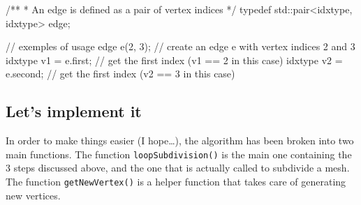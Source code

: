 \documentclass[a4paper,11pt]{article}
\newcommand{\hilight}[1]{\colorbox{bg}{#1}}
\newcommand{\code}[1]{\hilight{\texttt{#1}}}
\begin{document}
{\smaller
\begin{cppcode}
/**
 * An edge is defined as a pair of vertex indices 
 */
typedef std::pair<idxtype, idxtype> edge;

// exemples of usage
edge e(2, 3);           // create an edge e with vertex indices 2 and 3
idxtype v1 = e.first;   // get the first index (v1 == 2 in this case)
idxtype v2 = e.second;  // get the first index (v2 == 3 in this case)
\end{cppcode}
}


\subsection{Let's implement it}

In order to make things easier (I hope\ldots), the algorithm has been broken into two main functions. The function \code{loopSubdivision()} is the main one containing the 3 steps discussed above, and the one that is actually called to subdivide a mesh. The function \code{getNewVertex()} is a helper function that takes care of generating new vertices. 
\end{document}
